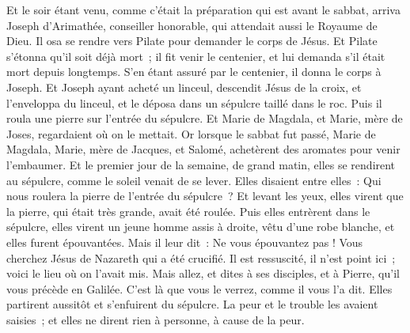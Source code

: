 \begin{multicols}{2}
Et le soir étant venu, comme c'était la préparation qui est avant le sabbat,
arriva Joseph d'Arimathée, conseiller honorable, qui attendait aussi le Royaume de Dieu. Il osa se rendre vers Pilate pour demander le corps de Jésus.
Et Pilate s'étonna qu'il soit déjà mort~; il fit venir le centenier, et lui demanda s'il était mort depuis longtemps.
S'en étant assuré par le centenier, il donna le corps à Joseph.
Et Joseph ayant acheté un linceul, descendit Jésus de la croix, et l'enveloppa du linceul, et le déposa dans un sépulcre taillé dans le roc. Puis il roula une pierre sur l'entrée du sépulcre.
Et Marie de Magdala, et Marie, mère de Joses, regardaient où on le mettait.
\VerseOne{}Or lorsque le sabbat fut passé, Marie de Magdala, Marie, mère de Jacques, et Salomé, achetèrent des aromates pour venir l'embaumer.
Et le premier jour de la semaine, de grand matin, elles se rendirent au sépulcre, comme le soleil venait de se lever.
Elles disaient entre elles~: Qui nous roulera la pierre de l'entrée du sépulcre~?
Et levant les yeux, elles virent que la pierre, qui était très grande, avait été roulée.
Puis elles entrèrent dans le sépulcre, elles virent un jeune homme assis à droite, vêtu d'une robe blanche, et elles furent épouvantées.
Mais il leur dit~: Ne vous épouvantez pas ! Vous cherchez Jésus de Nazareth qui a été crucifié. Il est ressuscité, il n'est point ici~; voici le lieu où on l'avait mis.
Mais allez, et dites à ses disciples, et à Pierre, qu'il vous précède en Galilée. C'est là que vous le verrez, comme il vous l'a dit.
Elles partirent aussitôt et s'enfuirent du sépulcre. La peur et le trouble les avaient saisies~; et elles ne dirent rien à personne, à cause de la peur.

\end{multicols}

